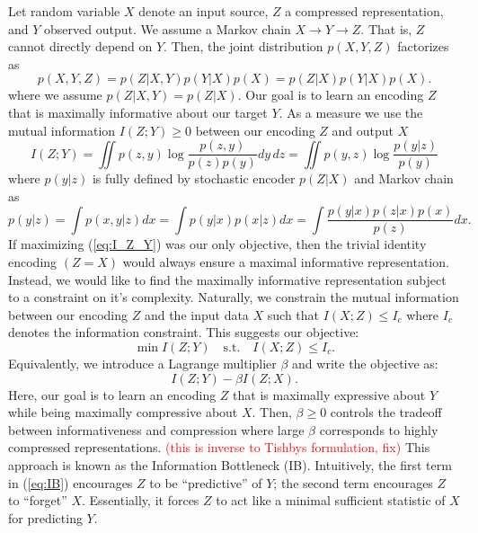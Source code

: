\documentclass[11pt]{article}
\newcommand\myworries[1]{\textcolor{red}{(#1)}}
\begin{document}
Let random variable $X$ denote an input source, $Z$ a compressed representation, and $Y$ observed output. We assume a Markov chain $X\rightarrow Y \rightarrow Z$. That is, $Z$ cannot directly depend on $Y$. Then, the joint distribution $p(X,Y,Z)$ factorizes as
\begin{equation}
p(X, Y, Z) = p(Z\vert X,Y)p(Y\vert X)p(X) = p(Z\vert X)p(Y\vert X)p(X).
\end{equation}
where we assume $p(Z\vert X,Y) = p(Z\vert X)$.
Our goal is to learn an encoding $Z$ that is maximally informative about our target $Y$. As a measure we use the mutual information $I(Z;Y) \geq 0$ between our encoding $Z$ and output $X$
\begin{equation}
I(Z;Y) = \iint p(z,y) \log \frac{p(z,y)}{p(z)p(y)} dy\, dz = \iint p(y,z) \log \frac{p(y\vert z)}{p(y)}
\label{eq:I_Z_Y}
\end{equation}
where  $p(y\vert z)$ is fully defined by stochastic encoder $p(Z\vert X)$ and Markov chain as
\begin{equation}
p(y\vert z) = \int p(x,y\vert z) dx = \int p(y \vert x) p(x \vert z) dx = \int \frac{p(y \vert x)p(z \vert x) p(x)}{p(z)}dx.
\label{eq:p_y_z}
\end{equation}
If maximizing (\ref{eq:I_Z_Y}) was our only objective, then the trivial identity encoding ${(Z = X)}$ would always ensure a maximal informative representation. Instead, we would like to find the maximally informative representation subject to a constraint on it's complexity. Naturally, we constrain the mutual information between our encoding $Z$ and the input data $X$ such that $I(X;Z) \leq I_c$ where $I_c$ denotes the information constraint. This suggests our objective:
\begin{equation}
\min I(Z;Y) \quad\text{s.t.}\quad I(X;Z) \leq I_c.
\end{equation}
Equivalently, we introduce a Lagrange multiplier $\beta$ and write the objective as:
\begin{equation}
I(Z;Y) - \beta I(Z;X).
\label{eq:IB}
\end{equation}
Here, our goal is to learn an encoding $Z$ that is maximally expressive about $Y$ while being maximally compressive about $X$. Then, $\beta\geq 0$ controls the tradeoff between informativeness and compression where large $\beta$ corresponds to highly compressed representations. \myworries{this is inverse to Tishbys formulation, fix} This approach is known as the Information Bottleneck (IB). Intuitively, the first term in (\ref{eq:IB}) encourages $Z$ to be ``predictive'' of $Y$; the second term encourages $Z$ to ``forget'' $X$. Essentially, it forces $Z$ to act like a minimal sufficient statistic of $X$ for predicting $Y$.
\end{document}
